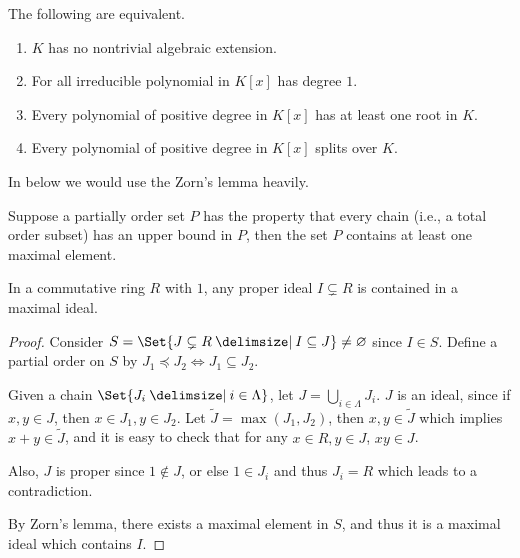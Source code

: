 \begin{prop}
  The following are equivalent.
  \begin{enumerate}
    \item $K$ has no nontrivial algebraic extension.
    \item For all irreducible polynomial in $K[x]$ has degree $1$.
    \item Every polynomial of  positive degree in $K[x]$ has at least one root in $K$.
    \item Every polynomial of  positive degree in $K[x]$ splits over $K$.
  \end{enumerate}
\end{prop}

In below we would use the Zorn's lemma heavily.
\begin{lemma}
  Suppose a partially order set $P$ has the property that every chain (i.e., a total order subset)
  has an upper bound in $P$, then the set $P$ contains at least one maximal element.
\end{lemma}

\begin{lemma} \label{lemma:max-ideal-exists}
  In a commutative ring $R$ with $1$, any proper ideal $I \subsetneq R$ is contained in a maximal ideal.

  \begin{proof}
    Consider $S = \Set{J \subsetneq R \given I \subseteq J} \neq \varnothing$ since $I \in S$.
    Define a partial order on $S$ by $J_1 \preceq J_2 \iff J_1 \subseteq J_2$.

    Given a chain $\Set{J_i \given i \in \Lambda}$, let $J = \bigcup_{i \in \Lambda} J_i$. $J$ is an
    ideal, since if $x, y \in J$, then $x \in J_1, y \in J_2$.
    Let $\tilde{J} = \max(J_1, J_2)$, then $x, y \in \tilde{J}$
    which implies $x + y \in \tilde{J}$, and it is easy to check that for any $x \in R, y \in J$, $xy \in J$.

    Also, $J$ is proper since $1 \notin J$, or else $1 \in J_i$ and thus $J_i = R$
    which leads to a contradiction.

    By Zorn's lemma, there exists a maximal element in $S$, and thus it is a
    maximal ideal which contains $I$.
  \end{proof}
\end{lemma}

